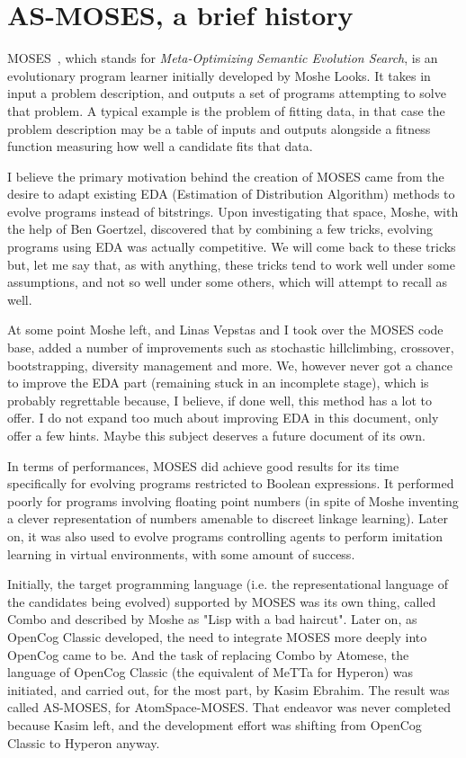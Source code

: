 \documentclass[]{report}
\begin{document}
\section{AS-MOSES, a brief history}

MOSES~\cite{Looks06abstractcompetent}, which stands for
\emph{Meta-Optimizing Semantic Evolution Search}, is an evolutionary
program learner initially developed by Moshe Looks.  It takes in input
a problem description, and outputs a set of programs attempting to
solve that problem.  A typical example is the problem of fitting data,
in that case the problem description may be a table of inputs and
outputs alongside a fitness function measuring how well a candidate
fits that data.

I believe the primary motivation behind the creation of MOSES came
from the desire to adapt existing EDA (Estimation of Distribution
Algorithm) methods to evolve programs instead of bitstrings.  Upon
investigating that space, Moshe, with the help of Ben Goertzel,
discovered that by combining a few tricks, evolving programs using EDA
was actually competitive.  We will come back to these tricks but, let
me say that, as with anything, these tricks tend to work well under
some assumptions, and not so well under some others, which will
attempt to recall as well.

At some point Moshe left, and Linas Vepstas and I took over the MOSES
code base, added a number of improvements such as stochastic
hillclimbing, crossover, bootstrapping, diversity management and more.
We, however never got a chance to improve the EDA part (remaining
stuck in an incomplete stage), which is probably regrettable because,
I believe, if done well, this method has a lot to offer.  I do not
expand too much about improving EDA in this document, only offer a few
hints.  Maybe this subject deserves a future document of its own.

In terms of performances, MOSES did achieve good results for its time
specifically for evolving programs restricted to Boolean expressions.
It performed poorly for programs involving floating point numbers (in
spite of Moshe inventing a clever representation of numbers amenable
to discreet linkage learning).  Later on, it was also used to evolve
programs controlling agents to perform imitation learning in virtual
environments, with some amount of success.

Initially, the target programming language (i.e. the representational
language of the candidates being evolved) supported by MOSES was its
own thing, called Combo and described by Moshe as "Lisp with a bad
haircut".  Later on, as OpenCog Classic developed, the need to
integrate MOSES more deeply into OpenCog came to be.  And the task of
replacing Combo by Atomese, the language of OpenCog Classic (the
equivalent of MeTTa for Hyperon) was initiated, and carried out, for
the most part, by Kasim Ebrahim.  The result was called AS-MOSES, for
AtomSpace-MOSES.  That endeavor was never completed because Kasim
left, and the development effort was shifting from OpenCog Classic to
Hyperon anyway.
\end{document}
